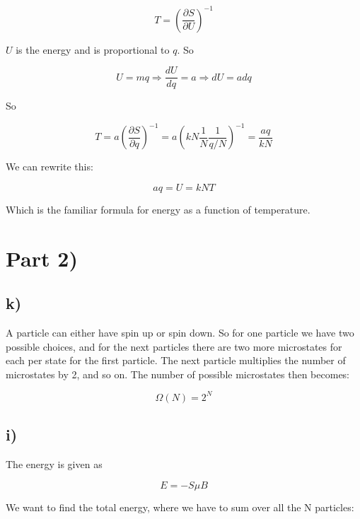 \documentclass[a4paper,norsk, 10pt]{article}
\begin{document}
\begin{equation}
T = \left(\frac{\partial S}{\partial U}\right)^{-1} 
\end{equation}

$U$ is the energy and is proportional to $q$. So

\begin{equation}
U = mq \Rightarrow \frac{dU}{dq} = a \Rightarrow dU = adq
\end{equation}

So

\begin{equation}
T = a\left(\frac{\partial S}{\partial q}\right)^{-1} = a\left(kN\frac{1}{N}\frac{1}{q/N}\right)^{-1} = \frac{aq}{kN}
\end{equation}

We can rewrite this:

\begin{equation}
aq = U = kNT
\end{equation}

Which is the familiar formula for energy as a function of temperature.

\section{Part 2)}
\subsection{k)}

A particle can either have spin up or spin down. So for one particle we have two possible choices, and for the next particles there are two more microstates for each per state for the first particle. The next particle multiplies the number of microstates by 2, and so on. The number of possible microstates then becomes:

\begin{equation}
\Omega(N) = 2^N
\end{equation}

\subsection{i)}
The energy is given as

\begin{equation}
E = -S\mu B
\end{equation}

We want to find the total energy, where we have to sum over all the N particles:
\end{document}
